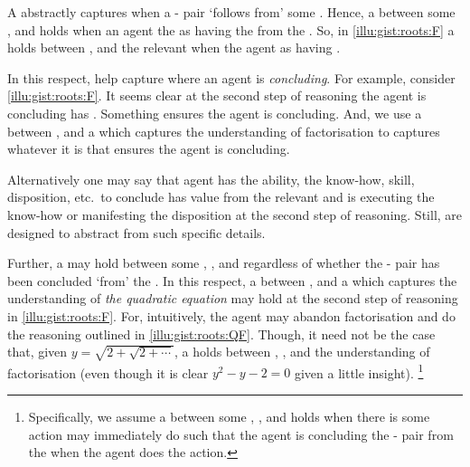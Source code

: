 \begin{note}
  A \emph{} abstractly captures when a - pair `follows from' some \pool{}.
  Hence, a \ros{} between some ,  and  holds when an agent \eval{} the \prop{} as having the  from the .
  So, in \autoref{illu:gist:roots:F} a \ros{} holds between \propM{\rootsCon{}},  and the relevant \pool{} when the agent \evals{} \propM{\rootsCon{}} as having  .

  In this respect,  help capture where an agent is \emph{concluding}.
  For example, consider \autoref{illu:gist:roots:F}.
  It seems clear at the second step of reasoning the agent is concluding \propM{\rootsCon{}} has \val{} .
  Something ensures the agent is concluding.
  And, we use a \ros{} between \propM{\rootsCon{}},  and a \pool{} which captures the \agents{} understanding of factorisation to captures whatever it is that ensures the agent is concluding.

  Alternatively one may say that agent has the ability, the know-how, skill, disposition, etc.\ to conclude \propM{\rootsCon{}} has value  from the relevant \pool{} and is executing the know-how or manifesting the disposition at the second step of reasoning.
  Still,  are designed to abstract from such specific details.

  Further, a  may hold between some , , and \pool{} regardless of whether the - pair has been concluded `from' the \pool{}.
  In this respect, a \ros{} between \propM{\rootsCon{}},  and a \pool{} which captures the \agents{} understanding of \emph{the quadratic equation} may hold at the second step of reasoning in \autoref{illu:gist:roots:F}.
  For, intuitively, the agent may abandon factorisation and do the reasoning outlined in \autoref{illu:gist:roots:QF}.
  Though, it need not be the case that, given \(y = \sqrt{ 2 + \sqrt{2 + \cdots}}\), a \ros{} holds between , , and the \agents{} understanding of factorisation (even though it is clear \(y^{2} - y - 2 = 0\) given a little insight).%
  \footnote{
    Specifically, we assume a \ros{} between some , , and  holds when there is some action may immediately do such that the agent is concluding the - pair from the \pool{} when the agent does the action.
  }
\end{note}



